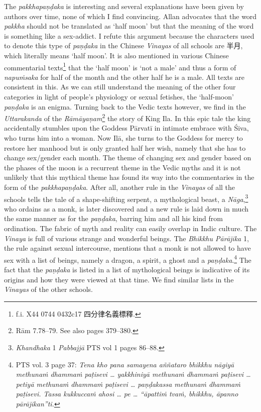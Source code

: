 The \textit{pakkhapaṇḍaka} is interesting and several explanations have been given by authors over time, none of which I find convincing. Allan \cite{bomhard} advocates that the word \textit{pakkha} should not be translated as `half moon' but that the meaning of the word is something like a sex-addict. I refute this argument because the characters used to denote this type of \textit{paṇḍaka} in the Chinese \textit{Vinayas} of all schools are 半月, which literally means `half moon'. It is also mentioned in various Chinese commentarial texts\footnote{f.i. X44 0744 0432c17 四分律名義標釋.} that the `half moon' is `not a male' and thus a form of \textit{napuṁsaka} for half of the month and the other half he is a male. All texts are consistent in this. As we can still understand the meaning of the other four categories in light of people's physiology or sexual fetishes, the `half-moon' \textit{paṇḍaka} is an enigma. Turning back to the Vedic texts however, we find in the \textit{Uttarakanda} of the \textit{Rāmāyaṇam}\footnote{Rām 7.78–79. See also \cite{goldman} pages 379–380.} the story of King Ila. In this epic tale the king accidentally stumbles upon the Goddess Pārvatī in intimate embrace with Śiva, who turns him into a woman. Now Ilā, she turns to the Goddess for mercy to restore her manhood but is only granted half her wish, namely that she has to change sex/gender each month. The theme of changing sex and gender based on the phases of the moon is a recurrent theme in the Vedic myths and it is not unlikely that this mythical theme has found its way into the commentaries in the form of the \textit{pakkhapaṇḍaka}. After all, another rule in the \textit{Vinayas} of all the schools tells the tale of a shape-shifting serpent, a mythological beast, a \textit{Nāga},\footnote{\textit{Khandhaka} 1 \textit{Pabbajjā} PTS vol 1 pages 86–88.} who ordains as a monk, is later discovered and a new rule is laid down in much the same manner as for the \textit{paṇḍaka}, barring him and all his kind from ordination. The fabric of myth and reality can easily overlap in Indic culture. The \textit{Vinaya} is full of various strange and wonderful beings. The ­\textit{Bhikkhu Pā­rāji­ka} 1, the rule against sexual intercourse, mentions that a monk is not allowed to have sex with a list of beings, namely a dragon, a spirit, a ghost and a \textit{paṇḍaka}.\footnote{PTS vol. 3 page 37: \textit{Tena kho pana samayena aññataro bhikkhu nāgiyā methunaṁ dhammaṁ paṭisevi … yakkhiniyā methunaṁ dhammaṁ paṭisevi … petiyā methunaṁ dhammaṁ paṭisevi … paṇḍakassa methunaṁ dhammaṁ paṭisevi. Tassa kukkuccaṁ ahosi … pe … ``āpattiṁ tvaṁ, bhikkhu, āpanno pārājikan''ti.}} The fact that the \textit{paṇḍaka} is listed in a list of mythological beings is indicative of its origins and how they were viewed at that time. We find similar lists in the \textit{Vinayas} of the other schools.

